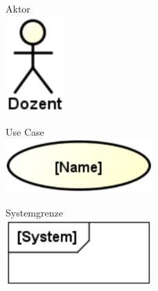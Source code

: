\documentclass[11pt, a4paper]{article}
\begin{document}
\begin{figure}[ht]
    \centering
    \begin{minipage}[t]{0.30\textwidth}
        \centering Aktor \\
        \vspace{1em}
        \centering \includegraphics[width=0.2\textwidth]{UseCase-00.png}
    \end{minipage}
    \centering
    \begin{minipage}[t]{0.30\textwidth}
        \centering Use Case \\
        \vspace{1em}
        \centering \includegraphics[width=0.5\textwidth]{UseCase-01.png}
    \end{minipage}
    \centering
    \begin{minipage}[t]{0.30\textwidth}
        \centering Systemgrenze \\
        \vspace{1em}
        \centering \includegraphics[width=0.5\textwidth]{UseCase-02.png}
    \end{minipage}
\end{figure}
\end{document}

